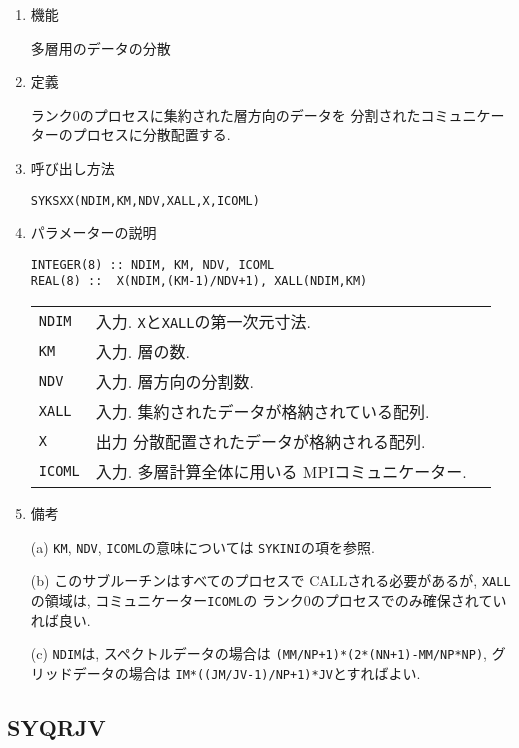 \documentclass[a4j]{jsarticle}
\begin{document}
\begin{enumerate}

\item 機能 

多層用のデータの分散

\item 定義

ランク0のプロセスに集約された層方向のデータを
分割されたコミュニケーターのプロセスに分散配置する.

\item 呼び出し方法 

\texttt{SYKSXX(NDIM,KM,NDV,XALL,X,ICOML)}
  
\item パラメーターの説明

\begin{verbatim}        
INTEGER(8) :: NDIM, KM, NDV, ICOML
REAL(8) ::  X(NDIM,(KM-1)/NDV+1), XALL(NDIM,KM)
\end{verbatim}      

\begin{tabular}{lll}
\texttt{NDIM} & 入力. \texttt{X}と\texttt{XALL}の第一次元寸法.\\
\texttt{KM} & 入力. 層の数.\\
\texttt{NDV} & 入力. 層方向の分割数.\\
\texttt{XALL} & 入力. 集約されたデータが格納されている配列.\\
\texttt{X} & 出力 分散配置されたデータが格納される配列.\\
\texttt{ICOML} & 入力. 多層計算全体に用いる MPIコミュニケーター.
\end{tabular}

\item 備考

(a) \texttt{KM}, \texttt{NDV}, \texttt{ICOML}の意味については
   \texttt{SYKINI}の項を参照.

(b) このサブルーチンはすべてのプロセスで CALLされる必要があるが,
\texttt{XALL}の領域は, コミュニケーター\texttt{ICOML}の
ランク0のプロセスでのみ確保されていれば良い.

(c) \texttt{NDIM}は, スペクトルデータの場合は
\texttt{(MM/NP+1)*(2*(NN+1)-MM/NP*NP)}, グリッドデータの場合は
\texttt{IM*((JM/JV-1)/NP+1)*JV}とすればよい.

\end{enumerate}


\subsection{SYQRJV}
\end{document}
